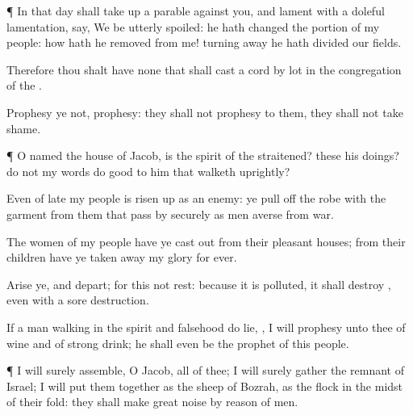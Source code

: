 {\par }{\PP {}¶ In that
day shall
{} take
up a
parable against you, and
lament with a
doleful
lamentation,
{}
say, We be
utterly
spoiled: he hath
changed the
portion of my
people: how hath he
removed
{} from me! turning
away he hath
divided our
fields.

Therefore thou shalt have none that shall
cast a
cord by
lot in the
congregation of the
{}.


\par }{\PP {}Prophesy ye not,
{}
prophesy: they shall not
prophesy to them,
{} they shall not
take
shame.


\par }{\PP {}¶ O
{}
named the
house of
Jacob, is the
spirit of the
{}
straitened?
{} these his
doings? do not my
words do
good to him that
walketh
uprightly?

Even of
late my
people is risen
up as an
enemy: ye pull
off the
robe
with the
garment from them that
pass by
securely as men
averse from
war.

The
women of my
people have ye cast
out from their
pleasant
houses; from their
children have ye taken
away my
glory for
ever.

Arise ye, and
depart; for this
{} not
{}
rest: because it is
polluted, it shall
destroy
{}, even with a
sore
destruction.

If a
man
walking in the
spirit and
falsehood do
lie,
{}, I will
prophesy unto thee of
wine and of strong
drink; he shall even be the
prophet of this
people.


\par }{\PP {}¶ I will
surely
assemble, O
Jacob, all of thee; I will
surely
gather the
remnant of
Israel; I will
put them
together as the
sheep of
Bozrah, as the
flock in the
midst of their
fold: they shall make great
noise by reason of
{}
men.

}
